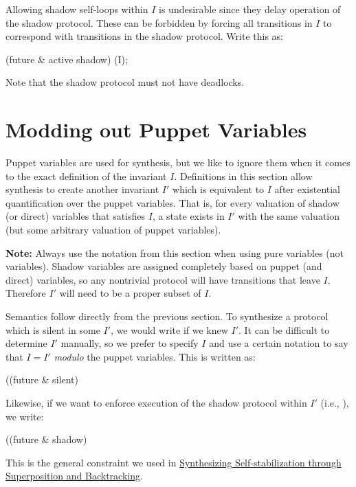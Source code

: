 Allowing shadow self-loops within $I$ is undesirable since they delay operation of the shadow protocol.
These can be forbidden by forcing all transitions in $I$ to correspond with transitions in the shadow protocol.
Write this as:
\begin{code}
(future & active shadow) (I);
\end{code}
Note that the shadow protocol must not have deadlocks.

\section{Modding out Puppet Variables}

Puppet variables are used for synthesis, but we like to ignore them when it comes to the exact definition of the invariant $I$.
Definitions in this section allow synthesis to create another invariant $I'$ which is equivalent to $I$ after existential quantification over the puppet variables.
That is, for every valuation of shadow (or direct) variables that satisfies $I$, a state exists in $I'$ with the same valuation (but some arbitrary valuation of puppet variables).

\textbf{Note:} Always use the notation from this section when using pure  variables (not  variables).
Shadow variables are assigned completely based on puppet (and direct) variables, so any nontrivial protocol will have transitions that leave $I$.
Therefore $I'$ will need to be a proper subset of $I$.

Semantics follow directly from the previous section.
To synthesize a protocol which is silent in some $I'$, we would write  if we knew $I'$.
It can be difficult to determine $I'$ manually, so we prefer to specify $I$ and use a certain notation to say that $I=I'$ \textit{modulo} the puppet variables.
This is written as:
\begin{code}
((future & silent) %
\end{code}

Likewise, if we want to enforce execution of the shadow protocol within $I'$ (i.e., ), we write:
\begin{code}
((future & shadow) %
\end{code}
This is the general constraint we used in \href{http://dx.doi.org/10.1007/978-3-319-11764-5_18}{Synthesizing Self-stabilization through Superposition and Backtracking}.

